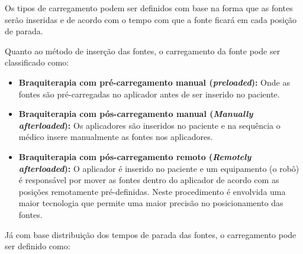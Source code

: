 \documentclass[11pt,a4paper]{article}
\begin{document}
			Os tipos de carregamento podem ser definidos com base na forma que as fontes serão inseridas e de acordo com o tempo com que a fonte ficará em cada posição de parada.

			Quanto ao método de inserção das fontes, o carregamento da fonte pode ser classificado como:

			\begin{itemize}
				\item \textbf{Braquiterapia com pré-carregamento manual (\textit{preloaded}):} Onde as fontes são pré-carregadas no aplicador antes de ser inserido no paciente.
				\item \textbf{Braquiterapia com pós-carregamento manual (\textit{Manually afterloaded}):} Os aplicadores são inseridos no paciente e na sequência o médico insere manualmente as fontes nos aplicadores.
				\item \textbf{Braquiterapia com pós-carregamento remoto (\textit{Remotely afterloaded}):} O aplicador é inserido no paciente e um equipamento (o robô) é responsável por mover as fontes dentro do aplicador de acordo com as posições remotamente pré-definidas. Neste procedimento é envolvida uma maior tecnologia que permite uma maior precisão no posicionamento das fontes.
			\end{itemize}

			Já com base distribuição dos tempos de parada das fontes, o carregamento pode ser definido como:
\end{document}
